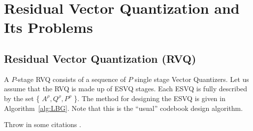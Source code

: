%
%
%
%

\chapter{Residual Vector Quantization and Its Problems}

\section{Residual Vector Quantization (RVQ)}

A $P$-stage RVQ consists of a sequence of $P$ single stage Vector
Quantizers.  Let us assume that the RVQ is made up of ESVQ stages.
Each ESVQ is fully described by the set \{ $A^{\rho}, Q^{\rho},
P^{\rho}$ \}.  The method for designing the ESVQ is given in
Algorithm~\ref{alg:LBG}.  Note that this is the ``usual'' codebook
design algorithm.%


Throw in some citations \cite{shucker,tbrady,moon,bar1}.


